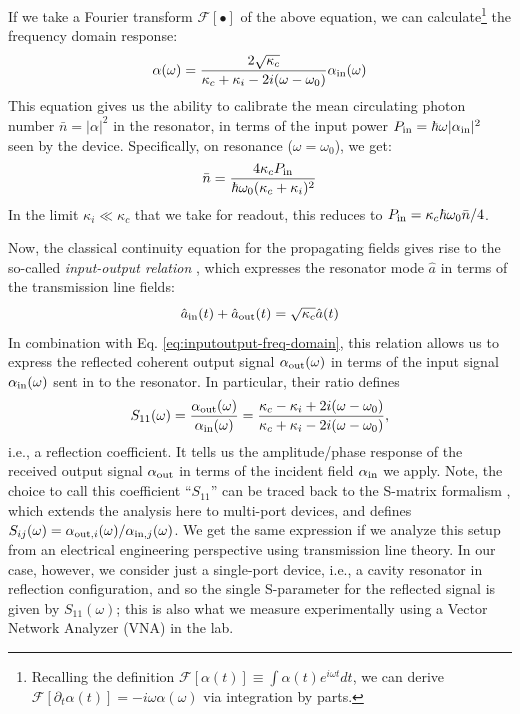 If we take a Fourier transform $\mathcal{F}[\bullet]$ of the above equation, we can calculate\footnote{Recalling the definition $\mathcal{F}[\alpha(t)] \equiv \int \alpha(t) e^{i\omega t}dt$, we can derive $\mathcal{F}[\partial_t\alpha(t)] = -i\omega \alpha(\omega)$ via integration by parts.} the frequency domain response:
\begin{equation}
    \alpha(\omega) = \frac{2\sqrt{\kappa_c}}{\kappa_c + \kappa_i - 2i(\omega-\omega_0)} \alpha_{\rm in}(\omega)
    \label{eq:inputoutput-freq-domain}
\end{equation}
This equation gives us the ability to calibrate the mean circulating photon number $\bar{n} = |\alpha|^2$ in the resonator, in terms of the input power $P_{\rm in} = \hbar\omega |\alpha_{\rm in}|^2$ seen by the device. Specifically, on resonance ($\omega = \omega_0$), we get:
\begin{equation}
    \bar{n} = \frac{4\kappa_c P_{\rm in}}{\hbar\omega_0(\kappa_c + \kappa_i)^2}
\end{equation}
In the limit $\kappa_i \ll \kappa_c$ that we take for readout, this reduces to $P_{\rm in} = \kappa_c\hbar\omega_0 \bar{n}/4$. 

\noindent Now, the classical continuity equation for the propagating fields gives rise to the so-called \textit{input-output relation} \cite{clerk2010introduction}, which expresses the resonator mode $\hat{a}$ in terms of the transmission line fields: 
\begin{equation}
    \hat{a}_{\rm in}(t) + \hat{a}_{\rm out}(t) = \sqrt{\kappa_c} \hat{a}(t)
    \label{eq:inputoutput}
\end{equation}
In combination with Eq. \eqref{eq:inputoutput-freq-domain}, this relation allows us to express the reflected coherent output signal $\alpha_{\rm out}(\omega)$ in terms of the input signal $\alpha_{\rm in}(\omega)$ sent in to the resonator. In particular, their ratio defines
\begin{equation}
   S_{11}(\omega) = \frac{\alpha_{\rm out}(\omega)}{\alpha_{\rm in}(\omega)} = \frac{\kappa_c - \kappa_i + 2i(\omega - \omega_0)}{\kappa_c + \kappa_i - 2i(\omega - \omega_0)},
   \label{eq:A_S11_ideal}
\end{equation}
i.e., a reflection coefficient. It tells us the amplitude/phase response of the received output signal  $\alpha_{\rm out}$ in terms of the incident field $\alpha_{\rm in}$ we apply. Note, the choice to call this coefficient ``$S_{11}$'' can be traced back to the S-matrix formalism \cite{kurokawa1965power, gardiner1985input}, which extends the analysis here to multi-port devices, and defines $S_{ij}(\omega) = \alpha_{{\rm out}, i}(\omega)/\alpha_{{\rm in}, j}(\omega)$. We get the same expression if we analyze this setup from an electrical engineering perspective using transmission line theory. In our case, however, we consider just a single-port device, i.e., a cavity resonator in reflection configuration, and so the single S-parameter for the reflected signal is given by $S_{11}(\omega)$; this is also what we measure experimentally using a Vector Network Analyzer (VNA) in the lab.  

